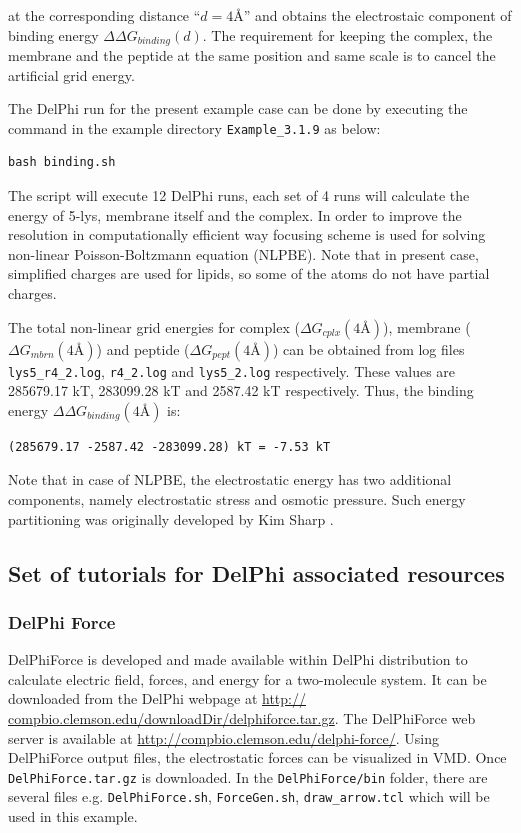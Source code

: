 \documentclass[9pt,tutorial]{livecoms}
\begin{document}
at the corresponding distance ``$ d = 4 \text{\AA} $'' and obtains the electrostaic component of binding energy $ \Delta\Delta G_{binding}(d) $. The requirement for keeping the complex, the membrane and the peptide at the same position and same scale is to cancel the artificial grid energy.

The DelPhi run for the present example case can be done by executing the command in the example directory \texttt{Example\_3.1.9} as below:
\begin{verbatim}
bash binding.sh
\end{verbatim} 

The script will execute 12 DelPhi runs, each set of 4 runs will calculate the energy of 5-lys, membrane itself and the complex. In order to improve the resolution in computationally efficient way focusing scheme is used for solving non-linear Poisson-Boltzmann equation (NLPBE). Note that in present case, simplified charges are used for lipids, so some of the atoms do not have partial charges.

The total non-linear grid energies for complex ($ \Delta G_{cplx}(4 \text{\AA}) $), membrane ($ \Delta G_{mbrn}(4 \text{\AA}) $) and peptide ($ \Delta G_{pept}(4 \text{\AA}) $) can be obtained from log files \texttt{lys5\_r4\_2.log}, \texttt{r4\_2.log} and \texttt{lys5\_2.log} respectively. These values are 285679.17 kT, 283099.28 kT and 2587.42 kT respectively. Thus, the binding energy $\Delta\Delta G_{binding}(4 \text{\AA}) $ is:

\begin{verbatim}
(285679.17 -2587.42 -283099.28) kT = -7.53 kT
\end{verbatim}

Note that in case of NLPBE, the electrostatic energy has two additional components, namely electrostatic stress and osmotic pressure. Such energy partitioning was originally developed by Kim Sharp \cite{sharp1990calculating}.

\subsection{Set of tutorials for DelPhi associated resources}

\subsubsection{DelPhi Force}

DelPhiForce\cite{li2017delphiforce} is developed and made available within DelPhi distribution to calculate electric field, forces, and energy for a two-molecule system. It can be downloaded from the DelPhi webpage at \url{http:// compbio.clemson.edu/downloadDir/delphiforce.tar.gz}. The DelPhiForce web server is available at \url{http://compbio.clemson.edu/delphi-force/}. Using DelPhiForce output files, the electrostatic forces can be visualized in VMD\cite{humphrey1996vmd}. Once \texttt{DelPhiForce.tar.gz} is downloaded. In the \texttt{DelPhiForce/bin} folder, there are several files e.g. 
\texttt{DelPhiForce.sh}, \texttt{ForceGen.sh}, \texttt{draw\_arrow.tcl} which will be used in this example.
\end{document}
